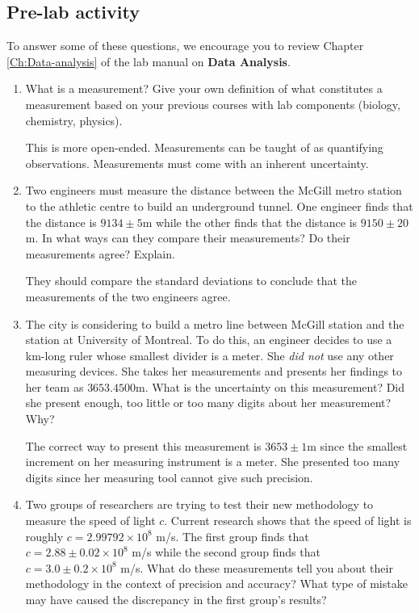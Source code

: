 \documentclass[12pt]{report}
\begin{document}
\subsection{Pre-lab activity}
To answer some of these questions, we encourage you to review Chapter \ref{Ch:Data-analysis} of the lab manual on  \textbf{Data Analysis}.
\begin{enumerate}
\item What is a measurement? Give your own definition of what constitutes a measurement based on your previous courses with lab components (biology, chemistry, physics).
\begin{tcolorbox}[title=Answer]
This is more open-ended. Measurements can be taught of as quantifying observations. Measurements must come with an inherent uncertainty.
\end{tcolorbox}
\item Two engineers must measure the distance between the McGill metro station to the athletic centre to build an underground tunnel. One engineer finds that the distance is $9134 \pm 5$m while the other finds that the distance is $9150 \pm 20$m. In what ways can they compare their measurements? Do their measurements agree? Explain.
\begin{tcolorbox}[title=Answer]
They should compare the standard deviations to conclude that the measurements of the two engineers agree.
\end{tcolorbox}
\item The city is considering to build a metro line between McGill station and the station at University of Montreal. To do this, an engineer decides to use a km-long ruler whose smallest divider is a meter. She \textit{did not} use any other measuring devices. She takes her measurements and presents her findings to her team as $3653.4500$m. What is the uncertainty on this measurement? Did she present enough, too little or too many digits about her measurement? Why?
\begin{tcolorbox}[title=Answer]
The correct way to present this measurement is $3653 \pm 1$m since the smallest increment on her measuring instrument is a meter. She presented too many digits since her measuring tool cannot give such precision.
\end{tcolorbox}
\item Two groups of researchers are trying to test their new methodology to measure the speed of light $c$. Current research shows that the speed of light is roughly $c=2.99 792 \times 10^8$ m/s. The first group finds that $c=2.88 \pm 0.02 \times 10^8$ m/s while the second group finds that $c=3.0 \pm 0.2 \times 10^8$ m/s. What do these measurements tell you about their methodology in the context of precision and accuracy? What type of mistake may have caused the discrepancy in the first group's results?

\end{enumerate}
\end{document}

